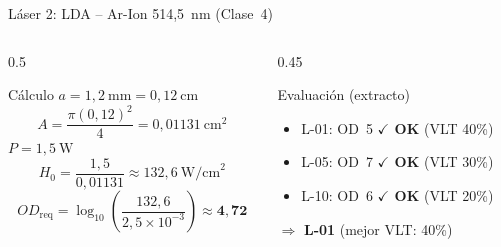 \documentclass[aspectratio=169,12pt]{beamer}
\begin{document}
\begin{frame}{Láser 2: LDA -- Ar-Ion 514,5~nm (Clase~4)}
	\begin{columns}
		\begin{column}{0.5\textwidth}
			\begin{block}{Cálculo}
				$a = 1{,}2~\text{mm} = 0{,}12~\text{cm}$
				\[A = \frac{\pi (0{,}12)^2}{4} = 0{,}01131~\text{cm}^2\]
				$P = 1{,}5~\text{W}$
				\[H_0 = \frac{1{,}5}{0{,}01131} \approx 132{,}6~\text{W/cm}^2\]
				\[OD_\mathrm{req} = \log_{10}\!\left(\frac{132{,}6}{2{,}5\times10^{-3}}\right) \approx \mathbf{4{,}72}\]
			\end{block}
		\end{column}
		\begin{column}{0.45\textwidth}
			\begin{exampleblock}{Evaluación (extracto)}
				\begin{itemize}
					\item L-01: OD~5 \textcolor{aerogreen}{\textbf{$\checkmark$ OK}} (VLT 40\%)
					\item L-05: OD~7 \textcolor{aerogreen}{\textbf{$\checkmark$ OK}} (VLT 30\%)
					\item L-10: OD~6 \textcolor{aerogreen}{\textbf{$\checkmark$ OK}} (VLT 20\%)
				\end{itemize}
			\end{exampleblock}
			\vspace{0.2cm}
			$\Rightarrow$ \textbf{L-01} (mejor VLT: 40\%)
		\end{column}
	\end{columns}
\end{frame}
\end{document}
